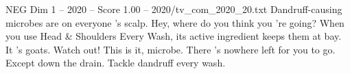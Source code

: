 \begin{textsample}{NEG Dim 1 – 2020 – Score 1.00 – 2020/tv\_com\_2020\_20.txt}  \label{ex:f1_neg_016}
Dandruff-causing microbes are on everyone 's scalp.
Hey, where do you think you 're going?
When you use Head \& Shoulders Every Wash, its active ingredient keeps them at bay.
It 's goats.
Watch out!
This is it, microbe.
There 's nowhere left for you to go.
Except down the drain.
Tackle dandruff every wash.

\end{textsample}
